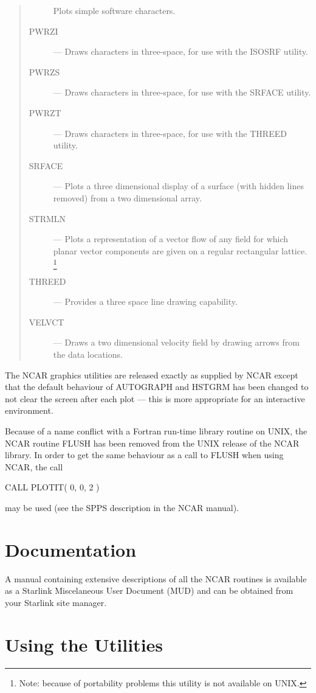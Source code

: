\documentclass[twoside,11pt,nolof,noabs]{starlink}
\begin{document}
\begin{quote}
\begin{description}
 Plots simple software characters.
\item [PWRZI] --- 
 Draws characters in three-space, for use with the ISOSRF utility.
\item [PWRZS] --- 
 Draws characters in three-space, for use with the SRFACE utility.
\item [PWRZT] --- 
 Draws characters in three-space, for use with the THREED utility.
\item [SRFACE] --- 
 Plots a three dimensional display of a surface (with hidden lines removed)
 from a two dimensional array.
\item [STRMLN] --- 
 Plots a representation of a vector flow of any field for which planar vector
 components are given on a regular rectangular lattice.
 \footnote{Note: because of portability problems this utility is not available
 on UNIX.}
\item [THREED] --- 
 Provides a three space line drawing capability.
\item [VELVCT] --- 
 Draws a two dimensional velocity field by drawing arrows from the data
 locations.
\end{description}
\end{quote}

The NCAR graphics utilities are released exactly as supplied by NCAR except
that the default behaviour of AUTOGRAPH and HSTGRM has been changed to not
clear the screen after each plot --- this is more appropriate for an
interactive environment. 

Because of a name conflict with a Fortran run-time library routine on
UNIX, the NCAR routine FLUSH has been removed from the UNIX release of
the NCAR library.  In order to get the same behaviour as a call to
FLUSH when using NCAR, the call

\begin{terminalv}
       CALL PLOTIT( 0, 0, 2 )
\end{terminalv}

may be used (see the SPPS description in the NCAR manual).


\section{Documentation}

A manual containing extensive descriptions of all the NCAR routines
is available as a Starlink Miscelaneous User Document (MUD) and can be 
obtained from your Starlink site manager. 


\section{Using the Utilities}
\end{document}

